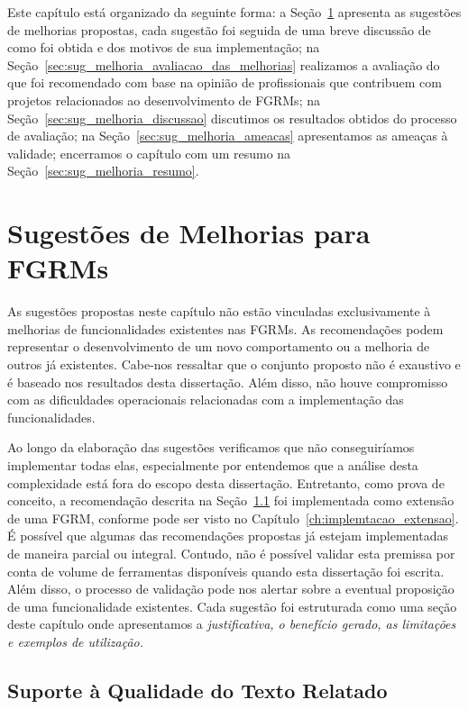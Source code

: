Este capítulo está organizado da seguinte forma: a
Seção~\ref{sec:sug_melhoria_melhorando_as_ferraementas} apresenta as sugestões
de melhorias propostas, cada sugestão foi seguida de uma breve discussão de como
foi obtida e dos motivos de sua implementação; na
Seção~\ref{sec:sug_melhoria_avaliacao_das_melhorias} realizamos a avaliação do
que foi recomendado com base na opinião de profissionais que
contribuem com projetos relacionados ao desenvolvimento de FGRMs; na
Seção~\ref{sec:sug_melhoria_discussao} discutimos os resultados obtidos do
processo de avaliação; na Seção~\ref{sec:sug_melhoria_ameacas} apresentamos as
ameaças à validade; encerramos o capítulo com um resumo na
Seção~\ref{sec:sug_melhoria_resumo}.

\section{Sugestões de Melhorias para FGRMs}
\label{sec:sug_melhoria_melhorando_as_ferraementas}

As sugestões propostas neste capítulo não estão vinculadas exclusivamente à
melhorias de funcionalidades existentes nas FGRMs. As recomendações podem
representar o desenvolvimento de um novo comportamento ou a melhoria de outros
já existentes. Cabe-nos ressaltar que o conjunto proposto não é exaustivo e é
baseado nos resultados desta dissertação. Além disso, não houve compromisso com
as dificuldades operacionais relacionadas com a implementação das
funcionalidades.

Ao longo da elaboração das sugestões verificamos que não conseguiríamos
implementar todas elas, especialmente por entendemos que a análise desta
complexidade está fora do escopo desta dissertação. Entretanto, como prova de
conceito, a recomendação descrita na
Seção~\ref{sub:supote_a_qualidade_do_relato} foi implementada como extensão de
uma FGRM, conforme pode ser visto no Capítulo~\ref{ch:implemtacao_extensao}.  É
possível que algumas das recomendações propostas já estejam implementadas de
maneira parcial ou integral. Contudo, não é possível validar esta premissa por
conta de volume de ferramentas disponíveis quando esta dissertação foi escrita.
Além disso, o processo de validação pode nos alertar sobre a eventual proposição
de uma funcionalidade existentes. Cada sugestão foi estruturada como uma seção
deste capítulo onde apresentamos a \textit{justificativa, o benefício gerado, as
    limitações e exemplos de utilização.}

\subsection{Suporte à Qualidade do Texto Relatado}
\label{sub:supote_a_qualidade_do_relato}

